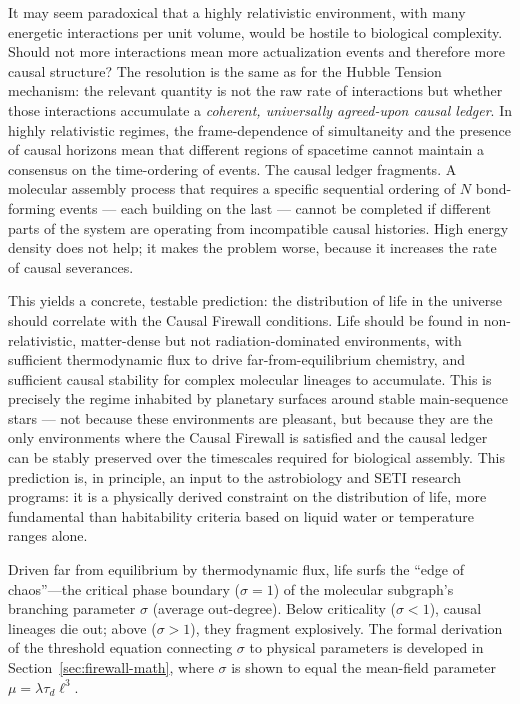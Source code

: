 \documentclass[11pt,a4paper]{article}
\theoremstyle{plain}
\theoremstyle{definition}
\theoremstyle{remark}
\begin{document}
It may seem paradoxical that a highly relativistic environment, with many energetic
interactions per unit volume, would be hostile to biological complexity. Should
not more interactions mean more actualization events and therefore more causal
structure? The resolution is the same as for the Hubble Tension mechanism:
the relevant quantity is not the raw rate of interactions but whether those
interactions accumulate a \emph{coherent, universally agreed-upon causal ledger}.
In highly relativistic regimes, the frame-dependence of simultaneity and the
presence of causal horizons mean that different regions of spacetime cannot
maintain a consensus on the time-ordering of events. The causal ledger fragments.
A molecular assembly process that requires a specific sequential ordering of
$N$ bond-forming events --- each building on the last --- cannot be completed if
different parts of the system are operating from incompatible causal histories.
High energy density does not help; it makes the problem worse, because it increases
the rate of causal severances.

This yields a concrete, testable prediction: the distribution of life in the
universe should correlate with the Causal Firewall conditions. Life should be
found in non-relativistic, matter-dense but not radiation-dominated environments,
with sufficient thermodynamic flux to drive far-from-equilibrium chemistry, and
sufficient causal stability for complex molecular lineages to accumulate. This is
precisely the regime inhabited by planetary surfaces around stable main-sequence
stars --- not because these environments are pleasant, but because they are the
only environments where the Causal Firewall is satisfied and the causal ledger
can be stably preserved over the timescales required for biological assembly.
This prediction is, in principle, an input to the astrobiology and SETI research
programs: it is a physically derived constraint on the distribution of life,
more fundamental than habitability criteria based on liquid water or temperature
ranges alone.

Driven far from equilibrium by thermodynamic flux, life surfs the ``edge of
chaos''---the critical phase boundary ($\sigma = 1$) of the molecular subgraph's
branching parameter $\sigma$ (average out-degree). Below criticality ($\sigma <
1$), causal lineages die out; above ($\sigma > 1$), they fragment explosively. The
formal derivation of the threshold equation connecting $\sigma$ to physical
parameters is developed in Section~\ref{sec:firewall-math}, where $\sigma$ is
shown to equal the mean-field parameter $\mu = \lambda\tau_d\ell^3$.
\end{document}
